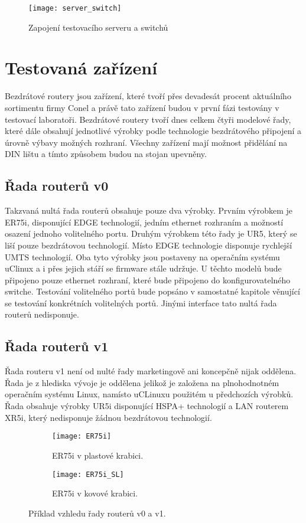 \begin{figure}[h]
  \centering
  \texttt{[image: server\_switch]}
  \caption{Zapojení testovacího serveru a switchů}
  \label{fig:server_switch}
\end{figure}

\section{Testovaná zařízení}
Bezdrátové routery jsou zařízení, které tvoří přes devadesát procent aktuálního sortimentu firmy Conel a právě tato zařízení budou v první fázi testovány v testovací laboratoři. Bezdrátové routery tvoří dnes celkem čtyři modelové řady, které dále obsahují jednotlivé výrobky podle technologie bezdrátového připojení a úrovně výbavy možných rozhraní. Všechny zařízení mají možnost přidělání na DIN lištu a tímto způsobem budou na stojan upevněny.

\subsection{Řada routerů v0}
Takzvaná nultá řada routerů obsahuje pouze dva výrobky. Prvním výrobkem je ER75i, disponující EDGE technologií, jedním ethernet rozhraním a možností osazení jednoho volitelného portu. Druhým výrobkem této řady je UR5, který se liší pouze bezdrátovou technologií. Místo EDGE technologie disponuje rychlejší UMTS technologií. Oba tyto výrobky jsou postaveny na operačním systému uClinux a i přes jejich stáří se firmware stále udržuje. U těchto modelů bude připojeno pouze ethernet rozhraní, které bude připojeno do konfigurovatelného switche. Testování volitelného portů bude popsáno v samostatné kapitole věnující se testování konkrétních volitelných portů. Jinými interface tato nultá řada routerů nedisponuje.

\subsection{Řada routerů v1}
Řada routeru v1 není od nulté řady marketingově ani koncepčně nijak oddělena. Řada je z hlediska vývoje je oddělena jelikož je založena na plnohodnotném operačním systému Linux, namísto uCLinuxu použitém u předchozích výrobků. Řada obsahuje výrobky UR5i disponující HSPA+ technologií a LAN routerem XR5i, který nedisponuje žádnou bezdrátovou technologií.

\begin{figure}[h]
  \begin{subfigure}[h]{0.5\LW}
    \centering
    \texttt{[image: ER75i]}
    \caption{ER75i v plastové krabici.}
    \label{fig:ER75i}
  \end{subfigure}
  \begin{subfigure}[h]{0.5\LW}
    \centering
    \texttt{[image: ER75i\_SL]}
    \caption{ER75i v kovové krabici.}
    \label{fig:ER75i SL}
  \end{subfigure}
  \caption{Příklad vzhledu řady routerů v0 a v1.}
  \label{fig:ER75i}
\end{figure}

